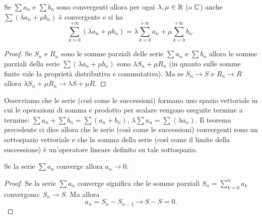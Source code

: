 \begin{theorem}
%
Se $\sum a_n$ e $\sum b_n$ sono convergenti
allora per ogni $\lambda,\mu\in {\mathbb R}$ (o ${\mathbb C}$)
anche $\sum (\lambda a_n + \mu b_n)$ è convergente
e si ha
\[
 \sum_{k=0}^{+\infty} (\lambda a_n + \mu b_n)
 = \lambda \sum_{k=0}^{+\infty} a_n  + \mu \sum_{k=0}^{+\infty} b_n.
\]
\end{theorem}
%
\begin{proof}
Se $S_n$ e $R_n$ sono le somme parziali delle serie $\sum a_n$ e $\sum b_n$
allora le somme parziali della serie $\sum (\lambda a_n + \mu b_n)$ sono
$\lambda S_n + \mu R_n$ (in quanto sulle somme finite vale la proprietà distributiva e commutativa). Ma se $S_n \to S$ e $R_n \to R$ allora
$\lambda S_n + \mu R_n \to \lambda S + \mu R$.
\end{proof}

Osserviamo che le serie (così come le successioni) formano uno spazio
vettoriale in cui le operazioni di somma e prodotto per scalare vengono
eseguite termine a termine: $\sum a_n + \sum b_n = \sum (a_n + b_n)$,
$\lambda \sum a_n = \sum (\lambda a_n)$.
Il teorema precedente ci dice allora che le serie (così come le successioni)
convergenti sono un sottospazio vettoriale e che la somma della serie (così come il limite della successione) è un'operatore lineare definito su tale sottospazio.

\begin{theorem}
\mymark{***}
%
Se la serie $\sum a_n$ converge allora $a_n \to 0$.
\end{theorem}
%
\begin{proof}
\mymark{***}
Se la serie $\sum a_n$ converge significa che le somme parziali
$S_n = \sum_{k=0}^n a_k$ convergono: $S_n \to S$. Ma allora
\[
  a_n = S_n - S_{n-1} \to S - S = 0.
\]
\end{proof}

